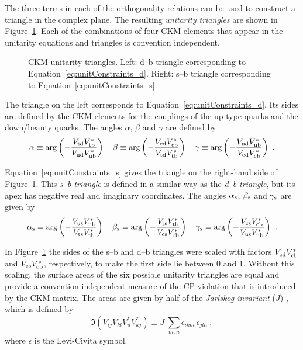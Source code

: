 The three terms in each of the orthogonality relations can be used to construct a triangle in the complex plane. The resulting
\emph{unitarity triangles} are shown in Figure~\ref{fig:unitTriangles}. Each of the combinations of four CKM elements that appear in the
unitarity equations and triangles is convention independent.
\begin{figure}[tb]
  \caption{CKM-unitarity triangles. Left: d--b triangle corresponding to Equation~\ref{eq:unitConstraints_d}. Right: s--b triangle
           corresponding to Equation~\ref{eq:unitConstraints_s}.}
  \label{fig:unitTriangles}
\end{figure}

The triangle on the left corresponds to Equation~\ref{eq:unitConstraints_d}. Its sides are defined by the CKM elements for the couplings of
the up-type quarks and the down/beauty quarks. The angles $\alpha$, $\beta$ and $\gamma$ are defined by
\begin{equation}
  \alpha \equiv \arg\left( -\frac{V_\text{td}V_\text{tb}^*}{V_\text{ud}V_\text{ub}^*} \right)
  \quad
  \beta  \equiv \arg\left( -\frac{V_\text{cd}V_\text{cb}^*}{V_\text{td}V_\text{tb}^*} \right)
  \quad
  \gamma \equiv \arg\left( -\frac{V_\text{ud}V_\text{ub}^*}{V_\text{cd}V_\text{cb}^*} \right)
  \ .
\end{equation}

Equation~\ref{eq:unitConstraints_s} gives the triangle on the right-hand side of Figure~\ref{fig:unitTriangles}. This \emph{s--b triangle}
is defined in a similar way as the \emph{d--b triangle}, but its apex has negative real and imaginary coordinates. The angles $\alpha_\text{s}$, $\beta_\text{s}$
and $\gamma_\text{s}$ are given by
\begin{equation}
  \alpha_\text{s} \equiv \arg\left( -\frac{V_\text{us}V_\text{ub}^*}{V_\text{ts}V_\text{tb}^*} \right)
  \quad
  \beta_\text{s} \equiv \arg\left( -\frac{V_\text{ts}V_\text{tb}^*}{V_\text{cs}V_\text{cb}^*} \right)
  \quad
  \gamma_\text{s} \equiv \arg\left( -\frac{V_\text{cs}V_\text{cb}^*}{V_\text{us}V_\text{ub}^*} \right)
  \ .
\end{equation}

In Figure~\ref{fig:unitTriangles} the sides of the s--b and d--b triangles were scaled with factors $V_\text{cd}V_\text{cb}^*$ and $V_\text{cs}V_\text{cb}^*$,
respectively, to make the first side lie between 0 and 1. Without this scaling, the surface areas of the six possible unitarity triangles
are equal and provide a convention-independent measure of the CP violation that is introduced by the CKM matrix. The areas are given by
half of the \emph{Jarlskog invariant} ($J$) \cite{Jarlskog:1985ht}, which is defined by
\begin{equation}
  \Im(V_{ij}V_{kl}V_{il}^*V_{kj}^*) \equiv J\; \sum_{m,n} \epsilon_{ikm}\,\epsilon_{jln}
  \ ,
\end{equation}
where $\epsilon$ is the Levi-Civita symbol.

